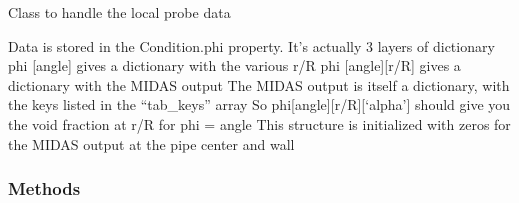 \documentclass[letterpaper,10pt,english]{sphinxmanual}
\begin{document}
\begin{fulllineitems}
\label{\detokenize{modules/MARIGOLD.Condition:MARIGOLD.Condition}}
\pysigstartsignatures
{}
\pysigstopsignatures
\sphinxAtStartPar
Class to handle the local probe data

\sphinxAtStartPar
Data is stored in the Condition.phi property. It’s actually 3 layers of dictionary
phi {[}angle{]} gives a dictionary with the various r/R
phi {[}angle{]}{[}r/R{]} gives a dictionary with the MIDAS output
The MIDAS output is itself a dictionary, with the keys listed in the “tab\_keys” array
So phi{[}angle{]}{[}r/R{]}{[}‘alpha’{]} should give you the void fraction at r/R for phi = angle
This structure is initialized with zeros for the MIDAS output at the pipe center and wall

\begin{fulllineitems}
\label{\detokenize{modules/MARIGOLD.Condition:MARIGOLD.Condition.__init__}}
\pysigstartsignatures
{}
\pysigstopsignatures
\end{fulllineitems}

\subsubsection*{Methods}



\end{fulllineitems}
\end{document}
